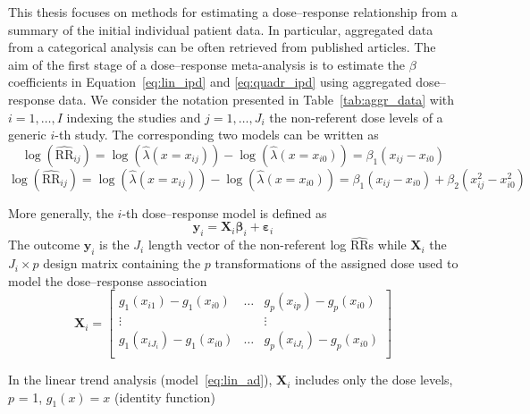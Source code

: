\documentclass[11pt,a4paper,twoside,openany]{book}\usepackage{knitr}
\begin{document}
{{\noindent This thesis focuses on methods for estimating a dose--response relationship from a summary of the initial individual patient data. In particular, aggregated data from a categorical analysis can be often retrieved from published articles. 
\noindent The aim of the first stage of a dose--response meta-analysis is to estimate the $\beta$ coefficients in Equation~\ref{eq:lin_ipd} and \ref{eq:quadr_ipd} using aggregated dose--response data. We consider the notation presented in Table~\ref{tab:aggr_data} with $i = 1, \dots, I$ indexing the studies and $j = 1, \dots, J_i$ the non-referent dose levels of a generic $i$-th study. The corresponding two models can be written as
\begin{equation}
\log \left( \widehat{\mathrm{RR}}_{ij} \right) = \log \left( \hat \lambda \left(x = x_{ij} \right) \right) - \log \left( \hat \lambda \left(x = x_{i0} \right) \right) = \beta_1\left(x_{ij} - x_{i0} \right)
\label{eq:lin_ad}
\end{equation}
\begin{equation}
\log \left( \widehat{\mathrm{RR}}_{ij} \right) = \log \left( \hat \lambda \left(x = x_{ij} \right) \right) - \log \left( \hat \lambda \left(x = x_{i0} \right) \right) = \beta_1\left(x_{ij} - x_{i0} \right) + \beta_2\left(x_{ij}^2 - x_{i0}^2 \right)
\label{eq:quadr_ad}
\end{equation}

\noindent More generally, the $i$-th dose--response model is defined as
\begin{equation}
\mathbf{y}_i = \mathbf{X}_i \boldsymbol{\beta}_i + \boldsymbol{\varepsilon}_i
\label{eq:drmodel}
\end{equation}
The outcome $\mathbf{y}_i$ is the $J_i$ length vector of the non-referent log $\widehat{\mathrm{RR}}$s while $\mathbf{X}_i$ the $J_i \times p$ design matrix containing the $p$ transformations of the assigned dose used to model the dose--response association
\begin{equation}
 \mathbf{X}_i=\left[
\begin{array}{ccc}
g_{1}(x_{i1}) - g_{1}(x_{i0}) & \hdots & g_{p}(x_{ip}) - g_{p}(x_{i0}) \\
\vdots &  & \vdots \\
g_{1}(x_{iJ_i}) -  g_{1}(x_{i0}) & \hdots & g_{p}(x_{iJ_i}) -  g_{p}(x_{i0}) \\
\end{array}%
\right] 
\label{eq:des.matrix}
\end{equation}

\noindent In the linear trend analysis (model~\ref{eq:lin_ad}), $\mathbf{X}_i$ includes only the dose levels, $p$ = 1, $g_1(x) = x$ (identity function)

}}
\end{document}
